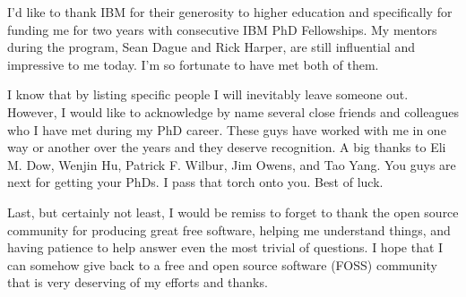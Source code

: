 I'd like to thank IBM for their generosity to higher education and specifically for funding me for two years with consecutive IBM PhD Fellowships. My mentors during the program, Sean Dague and Rick Harper, are still influential and impressive to me today. I'm so fortunate to have met both of them.

I know that by listing specific people I will inevitably leave someone out. However, I would like to acknowledge by name several close friends and colleagues who I have met during my PhD career. These guys have worked with me in one way or another over the years and they deserve recognition. A big thanks to Eli M. Dow, Wenjin Hu, Patrick F. Wilbur, Jim Owens, and Tao Yang. You guys are next for getting your PhDs. I pass that torch onto you. Best of luck. 

Last, but certainly not least, I would be remiss to forget to thank the open source community for producing great free software, helping me understand things, and having patience to help answer even the most trivial of questions. I hope that I can somehow give back to a free and open source software (FOSS) community that is very deserving of my efforts and thanks.



